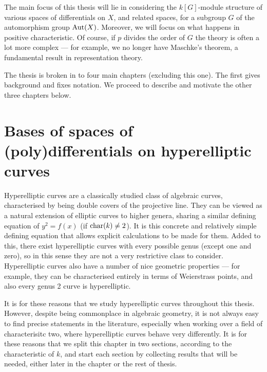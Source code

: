 The main focus of this thesis will lie in considering the $k[G]$-module structure of various spaces of differentials on $X$, and related spaces, for a subgroup $G$ of the automorphism group $\operatorname{Aut}(X)$.
Moreover, we will focus on what happens in positive characteristic.
Of course, if $p$ divides the order of $G$ the theory is often a lot more complex --- for example, we no longer have Maschke's theorem, a fundamental result in representation theory.

The thesis is broken in to four main chapters (excluding this one).
The first gives background and fixes notation.
We proceed to describe and motivate the other three chapters below.

\section{Bases of spaces of (poly)differentials on hyperelliptic curves}

Hyperelliptic curves are a classically studied class of algebraic curves, characterised by being double covers of the projective line.
They can be viewed as a natural extension of elliptic curves to higher genera, sharing a similar defining equation of $y^2 = f(x)$ (if $\operatorname{char}(k) \neq 2$).
It is this concrete and relatively simple defining equation that allows explicit calculations to be made for them.
Added to this, there exist hyperelliptic curves with every possible genus (except one and zero), so in this sense they are not a very restrictive class to consider.
Hyperelliptic curves also have a number of nice geometric properties --- for example, they can be characterised entirely in terms of Weierstrass points, and also every genus 2 curve is hyperelliptic.

It is for these reasons that we study hyperelliptic curves throughout this thesis.
However, despite being commonplace in algebraic geometry, it is not always easy to find precise statements in the literature, especially when working over a field of characterisitc two, where hyperelliptic curves behave very differently.
It is for these reasons that we split this chapter in two sections, according to the characteristic of $k$, and start each section by collecting results that will be needed, either later in the chapter or the rest of thesis.

